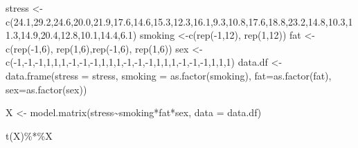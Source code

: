 \documentclass[
]{book}
\newenvironment{Shaded}{\begin{snugshade}}{\end{snugshade}}
\newcommand{\AttributeTok}[1]{\textcolor[rgb]{0.77,0.63,0.00}{#1}}
\newcommand{\DecValTok}[1]{\textcolor[rgb]{0.00,0.00,0.81}{#1}}
\newcommand{\FloatTok}[1]{\textcolor[rgb]{0.00,0.00,0.81}{#1}}
\newcommand{\FunctionTok}[1]{\textcolor[rgb]{0.00,0.00,0.00}{#1}}
\newcommand{\NormalTok}[1]{#1}
\newcommand{\OtherTok}[1]{\textcolor[rgb]{0.56,0.35,0.01}{#1}}
\newcommand{\SpecialCharTok}[1]{\textcolor[rgb]{0.00,0.00,0.00}{#1}}
\begin{document}
\begin{Shaded}
\begin{Highlighting}[]
\NormalTok{stress }\OtherTok{\textless{}{-}} \FunctionTok{c}\NormalTok{(}\FloatTok{24.1}\NormalTok{,}\FloatTok{29.2}\NormalTok{,}\FloatTok{24.6}\NormalTok{,}\FloatTok{20.0}\NormalTok{,}\FloatTok{21.9}\NormalTok{,}\FloatTok{17.6}\NormalTok{,}\FloatTok{14.6}\NormalTok{,}\FloatTok{15.3}\NormalTok{,}\FloatTok{12.3}\NormalTok{,}\FloatTok{16.1}\NormalTok{,}\FloatTok{9.3}\NormalTok{,}\FloatTok{10.8}\NormalTok{,}\FloatTok{17.6}\NormalTok{,}\FloatTok{18.8}\NormalTok{,}\FloatTok{23.2}\NormalTok{,}\FloatTok{14.8}\NormalTok{,}\FloatTok{10.3}\NormalTok{,}\FloatTok{11.3}\NormalTok{,}\FloatTok{14.9}\NormalTok{,}\FloatTok{20.4}\NormalTok{,}\FloatTok{12.8}\NormalTok{,}\FloatTok{10.1}\NormalTok{,}\FloatTok{14.4}\NormalTok{,}\FloatTok{6.1}\NormalTok{)}
\NormalTok{smoking }\OtherTok{\textless{}{-}}\FunctionTok{c}\NormalTok{(}\FunctionTok{rep}\NormalTok{(}\SpecialCharTok{{-}}\DecValTok{1}\NormalTok{,}\DecValTok{12}\NormalTok{), }\FunctionTok{rep}\NormalTok{(}\DecValTok{1}\NormalTok{,}\DecValTok{12}\NormalTok{))}
\NormalTok{fat }\OtherTok{\textless{}{-}} \FunctionTok{c}\NormalTok{(}\FunctionTok{rep}\NormalTok{(}\SpecialCharTok{{-}}\DecValTok{1}\NormalTok{,}\DecValTok{6}\NormalTok{), }\FunctionTok{rep}\NormalTok{(}\DecValTok{1}\NormalTok{,}\DecValTok{6}\NormalTok{),}\FunctionTok{rep}\NormalTok{(}\SpecialCharTok{{-}}\DecValTok{1}\NormalTok{,}\DecValTok{6}\NormalTok{), }\FunctionTok{rep}\NormalTok{(}\DecValTok{1}\NormalTok{,}\DecValTok{6}\NormalTok{))}
\NormalTok{sex }\OtherTok{\textless{}{-}} \FunctionTok{c}\NormalTok{(}\SpecialCharTok{{-}}\DecValTok{1}\NormalTok{,}\SpecialCharTok{{-}}\DecValTok{1}\NormalTok{,}\SpecialCharTok{{-}}\DecValTok{1}\NormalTok{,}\DecValTok{1}\NormalTok{,}\DecValTok{1}\NormalTok{,}\DecValTok{1}\NormalTok{,}\SpecialCharTok{{-}}\DecValTok{1}\NormalTok{,}\SpecialCharTok{{-}}\DecValTok{1}\NormalTok{,}\SpecialCharTok{{-}}\DecValTok{1}\NormalTok{,}\DecValTok{1}\NormalTok{,}\DecValTok{1}\NormalTok{,}\DecValTok{1}\NormalTok{,}\SpecialCharTok{{-}}\DecValTok{1}\NormalTok{,}\SpecialCharTok{{-}}\DecValTok{1}\NormalTok{,}\SpecialCharTok{{-}}\DecValTok{1}\NormalTok{,}\DecValTok{1}\NormalTok{,}\DecValTok{1}\NormalTok{,}\DecValTok{1}\NormalTok{,}\SpecialCharTok{{-}}\DecValTok{1}\NormalTok{,}\SpecialCharTok{{-}}\DecValTok{1}\NormalTok{,}\SpecialCharTok{{-}}\DecValTok{1}\NormalTok{,}\DecValTok{1}\NormalTok{,}\DecValTok{1}\NormalTok{,}\DecValTok{1}\NormalTok{)}
\NormalTok{data.df }\OtherTok{\textless{}{-}} \FunctionTok{data.frame}\NormalTok{(}\AttributeTok{stress =}\NormalTok{ stress, }\AttributeTok{smoking =} \FunctionTok{as.factor}\NormalTok{(smoking), }\AttributeTok{fat=}\FunctionTok{as.factor}\NormalTok{(fat), }\AttributeTok{sex=}\FunctionTok{as.factor}\NormalTok{(sex))}

\NormalTok{X }\OtherTok{\textless{}{-}} \FunctionTok{model.matrix}\NormalTok{(stress}\SpecialCharTok{\textasciitilde{}}\NormalTok{smoking}\SpecialCharTok{*}\NormalTok{fat}\SpecialCharTok{*}\NormalTok{sex, }\AttributeTok{data =}\NormalTok{ data.df)}

\FunctionTok{t}\NormalTok{(X)}\SpecialCharTok{\%*\%}\NormalTok{X}
\end{Highlighting}
\end{Shaded}
\end{document}
